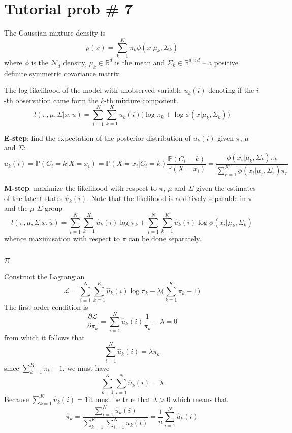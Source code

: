 \documentclass[a4paper]{article}
\newcommand{\Real}{\mathbb{R}}
\newcommand{\Ncal}{\mathcal{N}}
\newcommand{\Lcal}{\mathcal{L}}
\newcommand{\pr}[0]{{\mathbb{P}}}
\begin{document}
\clearpage
\section*{Tutorial prob \# 7} %
\label{sec:tutorial_prob_7}

The Gaussian mixture density is 
\[p(x) = \sum_{k=1}^K \pi_k \phi(x\lvert \mu_k, \Sigma_k)\]
where $\phi$ is the $\Ncal_d$ density, $\mu_k\in \Real^d$ is the mean and
$\Sigma_k\in\Real^{d\times d}$ -- a positive definite symmetric covariance matrix.

The log-likelihood of the model with unobserved variable $u_k(i)$ denoting
if the $i$-th observation came form the $k$-th mixture component.
\[
l(\pi, \mu, \Sigma\lvert x, u)
= \sum_{i=1}^N \sum_{k=1}^K u_k(i) \bigl(\log \pi_k + \log \phi(x\lvert \mu_k, \Sigma_k)\bigr)
\]

\textbf{E-step}: find the expectation of the posterior distribution of $u_k(i)$ given $\pi$, $\mu$ and $\Sigma$:
\[
\hat{u}_k(i)
= \pr(C_i=k\lvert X=x_i)
= \pr(X=x_i\lvert C_i=k)\frac{\pr(C_i=k)}{\pr(X=x_i)}
= \frac{\phi(x_i\lvert \mu_k, \Sigma_k) \pi_k}{\sum_{r=1}^K \phi(x_i\lvert \mu_r, \Sigma_r) \pi_r}
\]

\textbf{M-step}: maximize the likelihood with respect to $\pi$, $\mu$ and $\Sigma$ given the estimates
of the latent states $\hat{u}_k(i)$. Note that the likelihood is additively separable in $\pi$ and the $\mu$-$\Sigma$ group
\[
l(\pi, \mu, \Sigma\lvert x, \hat{u})
= \sum_{i=1}^N \sum_{k=1}^K \hat{u}_k(i) \log \pi_k + \sum_{i=1}^N \sum_{k=1}^K \hat{u}_k(i)\log \phi(x_i\lvert \mu_k, \Sigma_k)
\]
whence maximisation with respect to $\pi$ can be done separately.

\subsection*{$\pi$} %
\label{sub:_pi_}

Construct the Lagrangian
\[\Lcal = \sum_{i=1}^N \sum_{k=1}^K \hat{u}_k(i) \log \pi_k - \lambda\bigl( \sum_{k=1}^K \pi_k - 1\bigr)\]
The first order condition is
\[\frac{\partial \Lcal}{\partial \pi_k} = \sum_{i=1}^N \hat{u}_k(i) \frac{1}{\pi_k} - \lambda = 0\]
from which it follows that
\[\sum_{i=1}^N \hat{u}_k(i) = \lambda \pi_k\]
since $\sum_{k=1}^K \pi_k - 1$, we must have
\[\sum_{k=1}^K \sum_{i=1}^N \hat{u}_k(i) = \lambda\]
Because $\sum_{k=1}^K \hat{u}_k(i) = 1$it must be true that $\lambda > 0$ which means that
\[
\hat{\pi}_k
= \frac{ \sum_{i=1}^N \hat{u}_k(i) }{ \sum_{k=1}^K \sum_{i=1}^N \hat{u}_k(i) }
= \frac{1}{n} \sum_{i=1}^N \hat{u}_k(i)
\]
\end{document}
